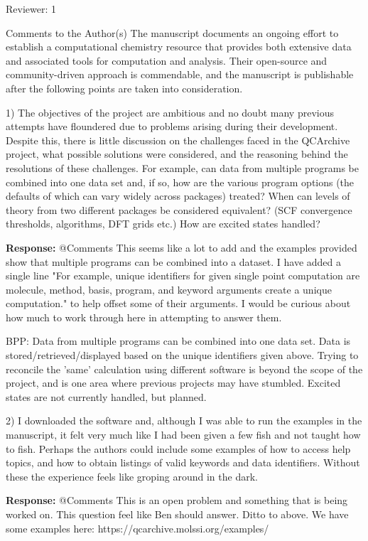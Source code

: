 Reviewer: 1

Comments to the Author(s) 
The manuscript documents an ongoing effort to establish a computational
chemistry resource that provides both extensive data and associated tools for 
computation and analysis.  Their open-source and community-driven approach is
commendable, and the manuscript is publishable after the following points are
taken into consideration.

1) The objectives of the project are ambitious and no doubt many previous
attempts have floundered due to problems arising during their development.
Despite this, there is little discussion on the challenges faced in the 
QCArchive project, what possible solutions were considered, and the reasoning
behind the resolutions of these challenges.  For example, can data from
multiple programs be combined into one data set and, if so, how are the various
program options (the defaults of which can vary widely across packages) treated?
When can levels of theory from two different packages be considered equivalent?
(SCF convergence thresholds, algorithms, DFT grids etc.)  How are excited
states handled?

\textbf{Response:} @Comments This seems like a lot to add and the examples provided show that multiple programs can be combined into a dataset. I have added a single line "For example, unique identifiers for given single point computation are molecule, method, basis, program, and keyword arguments create a unique computation." to help offset some of their arguments. I would be curious about how much to work through here in attempting to answer them.

BPP: Data from multiple programs can be combined into one data set. Data is stored/retrieved/displayed based on the unique identifiers given above. Trying to reconcile the 'same' calculation using different software is beyond the scope of the project, and is one area where previous projects may have stumbled. Excited states are not currently handled, but planned.


2) I downloaded the software and, although I was able to run the examples in the 
manuscript, it felt very much like I had been given a few fish and not taught
how to fish.  Perhaps the authors could include some examples of how to access
help topics, and how to obtain listings of valid keywords and data identifiers.
Without these the experience feels like groping around in the dark.

\textbf{Response: } @Comments This is an open problem and something that is being worked on. This question feel like Ben should answer. Ditto to above.
We have some examples here: https://qcarchive.molssi.org/examples/

